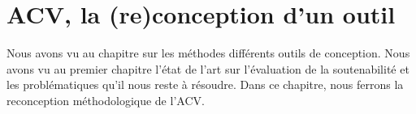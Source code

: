 \chapter{ACV, la (re)conception d'un outil}
\label{chap:ACV, la (re)conception d'un outil}
Nous avons vu au chapitre sur les méthodes différents outils de conception.
Nous avons vu au premier chapitre l'état de l'art sur l'évaluation de la soutenabilité et les problématiques qu'il nous reste à résoudre.
Dans ce chapitre, nous ferrons la reconception méthodologique de l'ACV.


% 


